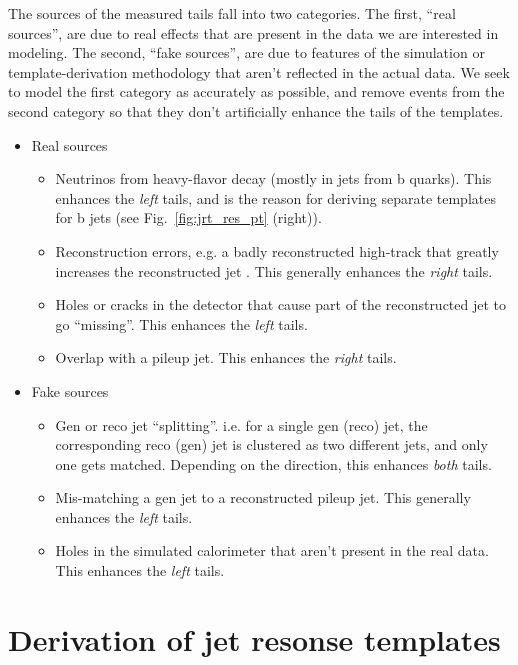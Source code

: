 The sources of the measured tails fall into two categories. The first, ``real sources'', 
are due to real effects that are present in the data we are interested in modeling. 
The second, ``fake sources'', are due to features of the simulation or template-derivation 
methodology that aren't reflected in the actual data. 
We seek to model the first category as accurately as possible, 
and remove events from the second category so that
they don't artificially enhance the tails of the templates.
\begin{itemize}
\item{Real sources}
   \begin{itemize}
   \item Neutrinos from heavy-flavor decay (mostly in jets from b quarks). This enhances the \emph{left} tails, and is the
   reason for deriving separate templates for b jets (see Fig.~\ref{fig:jrt_res_pt} (right)).
   \item Reconstruction errors, e.g. a badly reconstructed high-\pt track that greatly increases the reconstructed jet \pt. This generally enhances the \emph{right} tails.
   \item Holes or cracks in the detector that cause part of the reconstructed jet to go ``missing''. This enhances the \emph{left} tails.
   \item Overlap with a pileup jet. This enhances the \emph{right} tails.
   \end{itemize}
\item{Fake sources}
   \begin{itemize}
   \item Gen or reco jet ``splitting''. i.e. for a single gen (reco) jet, the corresponding reco (gen) jet is clustered as two different jets, and only one gets matched. 
   Depending on the direction, this enhances \emph{both} tails.
   \item Mis-matching a gen jet to a reconstructed pileup jet. This generally enhances the \emph{left} tails.
   \item Holes in the simulated calorimeter that aren't present in the real data. This enhances the \emph{left} tails.
   \end{itemize}
\end{itemize}


\section{Derivation of jet resonse templates}
\label{sec:jrt}

